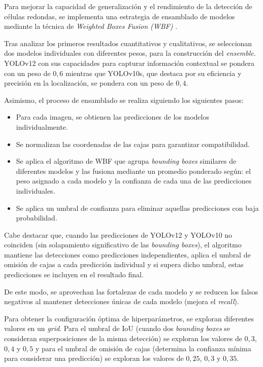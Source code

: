 \documentclass[12pt,a4paper,onecolumn,oneside]{report}
\begin{document}
Para mejorar la capacidad de generalización y el rendimiento de la detección de células redondas, se implementa una estrategia de ensamblado de modelos mediante la técnica de \textit{Weighted Boxes Fusion (WBF)} \cite{repoTFM}. 

Tras analizar los primeros resultados cuantitativos y cualitativos, se seleccionan dos modelos individuales con diferentes pesos, para la construcción del \textit{ensemble}. YOLOv12 con sus capacidades 
para capturar información contextual se pondera con un peso de $0,6$ mientras que YOLOv10s, que destaca por su eficiencia y precisión en la localización, se pondera con un peso de $0,4$.

Asimismo, el proceso de ensamblado se realiza siguiendo los siguientes pasos:

\begin{itemize}
  \item Para cada imagen, se obtienen las predicciones de los modelos individualmente.
  \item Se normalizan las coordenadas de las cajas para garantizar compatibilidad.
  \item Se aplica el algoritmo de WBF que agrupa \textit{bounding boxes} similares de diferentes modelos y las fusiona mediante un promedio ponderado según: el peso asignado a cada modelo y la confianza de cada una de las predicciones individuales.
  \item Se aplica un umbral de confianza para eliminar aquellas predicciones con baja probabilidad.
\end{itemize}

Cabe destacar que, cuando las predicciones de YOLOv12 y YOLOv10 no coinciden (sin solapamiento significativo de las \textit{bounding boxes}), el algoritmo mantiene las detecciones como predicciones independientes,
aplica el umbral de omisión de cajas a cada predicción individual y si supera dicho umbral, estas predicciones se incluyen en el resultado final.

De este modo, se aprovechan las fortalezas de cada modelo y se reducen los falsos negativos al mantener detecciones únicas de cada modelo (mejora el \textit{recall}).

Para obtener la configuración óptima de hiperparámetros, se exploran diferentes valores en un \textit{grid}. Para el umbral de IoU (cuando dos \textit{bounding boxes} se consideran superposiciones de la misma detección) se exploran los valores 
de $0,3$, $0,4$ y $0,5$ y para el umbral de omisión de cajas (determina la confianza mínima para considerar una predicción) se exploran los valores de $0,25$, $0,3$ y $0,35$.
\end{document}
